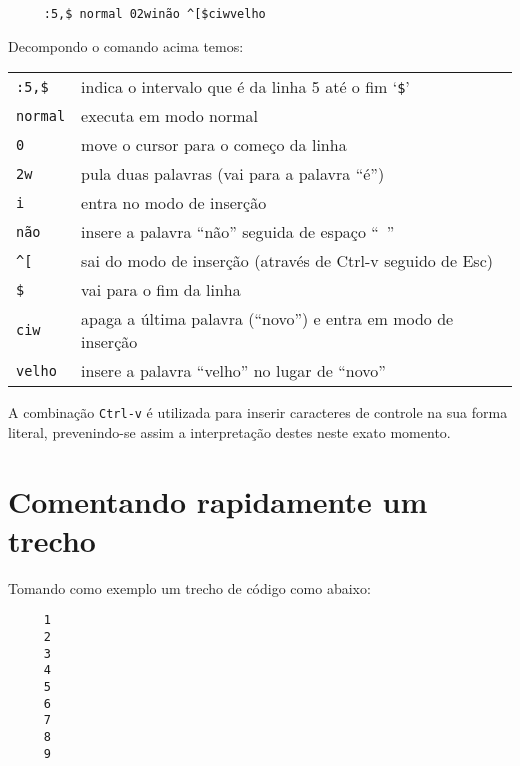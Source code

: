 \begin{verbatim}
     :5,$ normal 02winão ^[$ciwvelho
\end{verbatim}

Decompondo o comando acima temos:

\begin{table}[htb]\begin{center} \begin{tabular}{ll} \hline
     \verb|:5,$| &  indica o intervalo que é da linha 5 até o fim `\verb|$|'\\
     \verb|normal| &  executa em modo normal\\
     \verb|0| &  move o cursor para o começo da linha\\
     \verb|2w| &  pula duas palavras (vai para a palavra ``é'')\\
     \verb|i| &  entra no modo de inserção\\
     \verb|não | &  insere a palavra ``não'' seguida de espaço ``~''\\
     \verb|^[| & sai do modo de inserção (através de Ctrl-v seguido de Esc)\\
     \verb|$| &  vai para o fim da linha\\
     \verb|ciw| &  apaga a última palavra (``novo'') e entra em modo de inserção\\
     \verb|velho| &  insere a palavra ``velho'' no lugar de ``novo''\\
\hline \end{tabular}\end{center}\end{table}

A combinação \verb|Ctrl-v| é utilizada para inserir caracteres de controle na
sua forma literal, prevenindo-se assim a interpretação destes neste exato
momento.

\section{Comentando rapidamente um trecho}

Tomando como exemplo um trecho de código como abaixo:

\begin{verbatim}
     1   
     2   
     3   
     4   
     5   
     6   
     7   
     8   
     9   
\end{verbatim}

